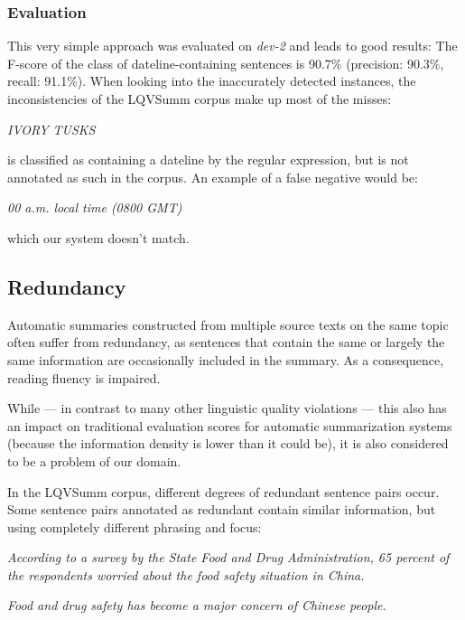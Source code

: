\documentclass[a4paper,10pt]{scrartcl}
\theoremstyle{style}
\begin{document}
\subsubsection{Evaluation}
This very simple approach was evaluated on \textit{dev-2} and leads to good results: The F-score of the class of dateline-containing sentences is 90.7\% (precision: 90.3\%, recall: 91.1\%). When looking into the inaccurately detected instances, the inconsistencies of the LQVSumm corpus make up most of the misses:


\textit{IVORY TUSKS}

is classified as containing a dateline by the regular expression, but is not annotated as such in the corpus. An example of a false negative would be:

\textit{00 a.m. local time (0800 GMT)}

which our system doesn't match.

\subsection{Redundancy}
\label{redundancy}

Automatic summaries constructed from multiple source texts on the same topic often suffer from redundancy, as sentences that contain the same or largely the same information are occasionally included in the summary. As a consequence, reading fluency is impaired.

While --- in contrast to many other linguistic quality violations --- this also has an impact on traditional evaluation scores for automatic summarization systems (because the information density is lower than it could be), it is also considered to be a problem of our domain.

In the LQVSumm corpus, different degrees of redundant sentence pairs occur. Some sentence pairs annotated as redundant contain similar information, but using completely different phrasing and focus:

\textit{According to a survey by the State Food and Drug Administration, 65 percent of the respondents worried about the food safety situation in China.}

\textit{Food and drug safety has become a major concern of Chinese people.}
\end{document}
